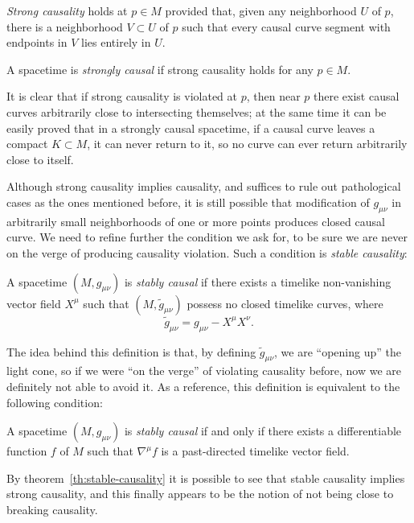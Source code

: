 \begin{definition}
	\emph{Strong causality} holds at \(p\in M\) provided that, given any neighborhood \(U\) of \(p\), there is a neighborhood \(V\subset U\) of \(p\) such that every causal curve segment with endpoints in \(V\) lies entirely in \(U\).

	\noindent A spacetime is \emph{strongly causal} if strong causality holds for any \(p\in M\).
\end{definition}

	It is clear that if strong causality is violated at \(p\), then near \(p\) there exist causal curves arbitrarily close to intersecting themselves; at the same time it can be easily proved that in a strongly causal spacetime, if a causal curve leaves a compact \(K\subset M\), it can never return to it, so no curve can ever return arbitrarily close to itself.

	Although strong causality implies causality, and suffices to rule out pathological cases as the ones mentioned before, it is still possible that modification of \(g_{\mu\nu}\) in arbitrarily small neighborhoods of one or more points produces closed causal curve. We need to refine further the condition we ask for, to be sure we are never on the verge of producing causality violation. Such a condition is \emph{stable causality}:
	\begin{definition}
		A spacetime \((M, g_{\mu\nu})\) is \emph{stably causal} if there exists a timelike non-vanishing vector field \(X^{\mu}\) such that \((M, \tilde{g}_{\mu\nu})\) possess no closed timelike curves, where
		\[
			\tilde{g}_{\mu\nu}= g_{\mu\nu} - X^{\mu}X^{\nu}.
		\]
	\end{definition}
	The idea behind this definition is that, by defining \(\tilde{g}_{\mu\nu}\), we are ``opening up'' the light cone, so if we were ``on the verge'' of violating causality before, now we are definitely not able to avoid it. As a reference, this definition is equivalent to the following condition:
	\begin{theorem}
		\label{th:stable-causality}
		A spacetime \((M, g_{\mu\nu})\) is \emph{stably causal} if and only if there exists a differentiable function \(f\) of \(M\) such that \(\nabla^{\mu}f\) is a past-directed timelike vector field.
	\end{theorem}
By theorem~\ref{th:stable-causality} it is possible to see that stable causality implies strong causality, and this finally appears to be the notion of not being close to breaking causality.

